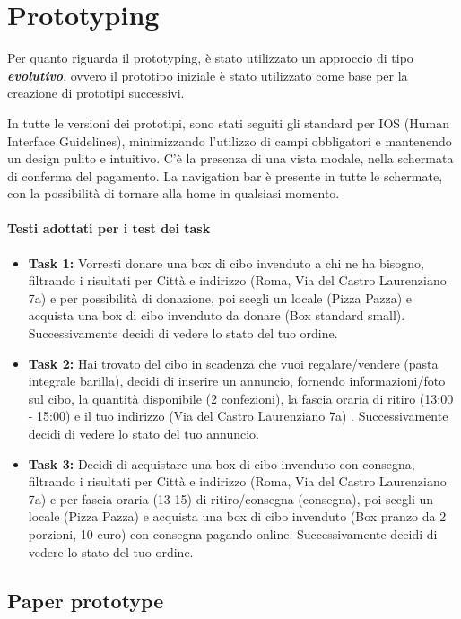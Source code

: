\documentclass{article}
\begin{document}
\newpage
\section{Prototyping}

Per quanto riguarda il prototyping, è stato utilizzato un approccio di tipo \textit{\textbf{evolutivo}}, ovvero il prototipo iniziale è stato utilizzato come base per la creazione di prototipi successivi.

In tutte le versioni dei prototipi, sono stati seguiti gli standard per IOS (Human Interface Guidelines), minimizzando l'utilizzo di campi obbligatori e mantenendo un design pulito e intuitivo.
C'è la presenza di una vista modale, nella schermata di conferma del pagamento.
La navigation bar è presente in tutte le schermate, con la possibilità di tornare alla home in qualsiasi momento.

\paragraph{Testi adottati per i test dei task}
\begin{itemize}
    \item \textbf{Task 1:} Vorresti donare una box di cibo invenduto a chi ne ha bisogno, filtrando i risultati per Città e indirizzo (Roma, Via del Castro Laurenziano 7a) e per possibilità di donazione, poi scegli un locale (Pizza Pazza) e acquista una box di cibo invenduto da donare (Box standard small). Successivamente decidi di vedere lo stato del tuo ordine.
    \item \textbf{Task 2:} Hai trovato del cibo in scadenza che vuoi regalare/vendere (pasta integrale barilla), decidi di inserire un annuncio, fornendo informazioni/foto sul cibo, la quantità disponibile (2 confezioni), la fascia oraria di ritiro (13:00 - 15:00) e il tuo indirizzo (Via del Castro Laurenziano 7a) . Successivamente decidi di vedere lo stato del tuo annuncio.
    \item \textbf{Task 3:} Decidi di acquistare una box di cibo invenduto con consegna, filtrando i risultati per Città  e indirizzo (Roma, Via del Castro Laurenziano 7a) e per fascia oraria (13-15) di ritiro/consegna (consegna), poi scegli un locale (Pizza Pazza) e acquista una box di cibo invenduto (Box pranzo da 2 porzioni, 10 euro) con consegna pagando online. Successivamente decidi di vedere lo stato del tuo ordine.
\end{itemize}


\subsection{Paper prototype}
\end{document}
